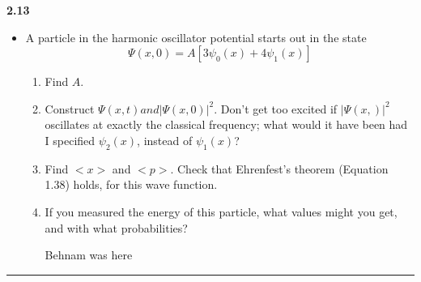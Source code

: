 \documentclass[fleqn]{article}
\begin{document}
  \textbf{2.13}
  \begin{itemize}
    \item A particle in the harmonic oscillator potential starts out in the state 
    $$\Psi(x, 0)=A \left[3\psi_0(x)+4\psi_1(x)\right]$$ 
    \begin{enumerate}
      \item Find $A$.

      \item Construct $\Psi(x, t) and |\Psi(x, 0)|^2$. Don't get too excited if $|\Psi(x, )|^2$ oscillates 
      at exactly the classical frequency; what would it have been had I specified $\psi_2(x)$, instead of
      $\psi_1(x)$?

      \item Find $<x>$ and $<p>$. Check that Ehrenfest's theorem (Equation 1.38) holds, for this wave function.

      \item If you measured the energy of this particle, what values might you get, and with what probabilities?

        \textcolor{hwColor}{
          Behnam was here
        }

    \end{enumerate}
  \end{itemize}

  \rule{15cm}{1pt}
\end{document}
